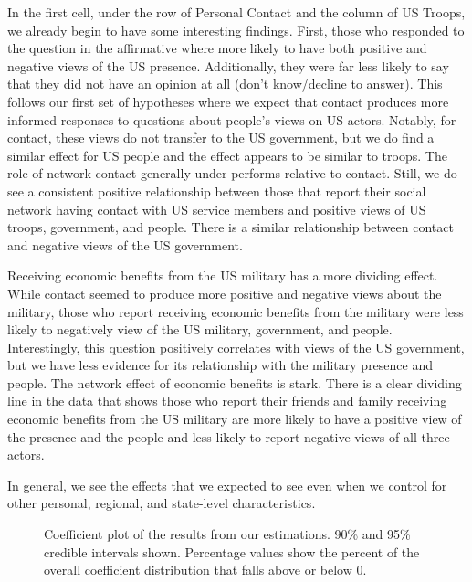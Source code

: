 In the first cell, under the row of Personal Contact and the column of US Troops, we already begin to have some interesting findings. First, those who responded to the question in the affirmative where more likely to have both positive and negative views of the US presence. Additionally, they were far less likely to say that they did not have an opinion at all (don't know/decline to answer). This follows our first set of hypotheses where we expect that contact produces more informed responses to questions about people's views on US actors. Notably, for contact, these views do not transfer to the US government, but we do find a similar effect for US people and the effect appears to be similar to troops. The role of network contact generally under-performs relative to contact. Still, we do see a consistent positive relationship between those that report their social network having contact with US service members and positive views of US troops, government, and people. There is a similar relationship between contact and negative views of the US government. 

Receiving economic benefits from the US military has a more dividing effect. While contact seemed to produce more positive and negative views about the military, those who report receiving economic benefits from the military were less likely to negatively view of the US military, government, and people. Interestingly, this question positively correlates with views of the US government, but we have less evidence for its relationship with the military presence and people. The network effect of economic benefits is stark. There is a clear dividing line in the data that shows those who report their friends and family receiving economic benefits from the US military are more likely to have a positive view of the presence and the people and less likely to report negative views of all three actors. 

In general, we see the effects that we expected to see even when we control for other personal, regional, and state-level characteristics.





\begin{figure}[t]
	\centering  {}
	\caption{Coefficient plot of the results from our estimations. 90\% and 95\% credible intervals shown. Percentage values show the percent of the overall coefficient distribution that falls above or below 0.}
	\label{fig:coefplot1}
\end{figure}%


